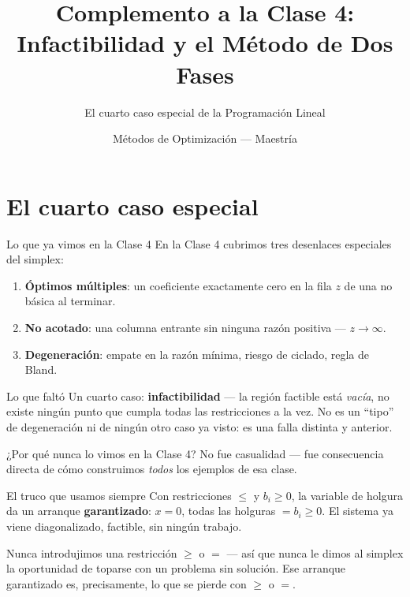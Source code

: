 \documentclass[aspectratio=169]{beamer}
\title{Complemento a la Clase 4: Infactibilidad y el Método de Dos Fases}
\subtitle{El cuarto caso especial de la Programación Lineal}
\author{Métodos de Optimización --- Maestría}
\institute{Universidad Pontificia Bolivariana}
\date{}
\begin{document}
\maketitle

\section{El cuarto caso especial}

\begin{frame}{Lo que ya vimos en la Clase 4}
En la Clase 4 cubrimos tres desenlaces especiales del simplex:

\begin{enumerate}
\item \textbf{Óptimos múltiples}: un coeficiente exactamente cero en la fila $z$ de una no básica al terminar.
\item \textbf{No acotado}: una columna entrante sin ninguna razón positiva --- $z\to\infty$.
\item \textbf{Degeneración}: empate en la razón mínima, riesgo de ciclado, regla de Bland.
\end{enumerate}

\begin{alertblock}{Lo que faltó}
Un cuarto caso: \textbf{infactibilidad} --- la región factible está \emph{vacía}, no existe ningún punto que cumpla todas las restricciones a la vez. No es un ``tipo'' de degeneración ni de ningún otro caso ya visto: es una falla distinta y anterior.
\end{alertblock}
\end{frame}

\begin{frame}{¿Por qué nunca lo vimos en la Clase 4?}
No fue casualidad --- fue consecuencia directa de cómo construimos \emph{todos} los ejemplos de esa clase.

\begin{block}{El truco que usamos siempre}
Con restricciones $\leq$ y $b_i\geq0$, la variable de holgura da un arranque \textbf{garantizado}: $x=0$, todas las holguras $=b_i\geq0$. El sistema ya viene diagonalizado, factible, sin ningún trabajo.
\end{block}

Nunca introdujimos una restricción $\geq$ o $=$ --- así que nunca le dimos al simplex la oportunidad de toparse con un problema sin solución. Ese arranque garantizado es, precisamente, lo que se pierde con $\geq$ o $=$.
\end{frame}
\end{document}

